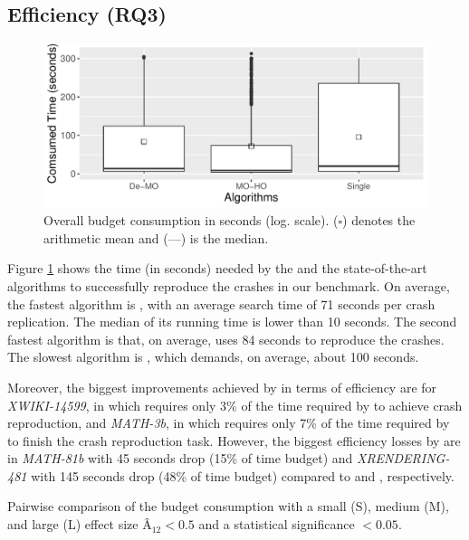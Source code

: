 \subsection{Efficiency (RQ3)}
\label{sec:results:rq3}

\begin{figure}[t]
    \centering
    \includegraphics[width=\linewidth]{papers/moho/figures/time-overall.pdf}
    \caption{Overall budget consumption in seconds (log. scale). ($\square$) denotes the arithmetic mean and (---) is the median.}
    \label{fig:eval:results-rq2-overall}
\end{figure}


Figure \ref{fig:eval:results-rq2-overall} shows the time (in seconds) needed by the \moho and the state-of-the-art algorithms to successfully reproduce the crashes in our benchmark.
On average, the fastest algorithm is \moho, with an average search time of 71 seconds per crash replication. The median of its running time is lower than 10 seconds. The second fastest algorithm is \decomposition that, on average, uses 84 seconds to reproduce the crashes. The slowest algorithm is \SGGA, which demands, on average, about 100 seconds. 

Moreover, the biggest improvements achieved by \moho in terms of efficiency are for \textit{XWIKI-14599}, in which \moho requires only 3\% of the time required by \SGGA to achieve crash reproduction, and \textit{MATH-3b}, in which \moho requires only 7\% of the time required by \decomposition to finish the crash reproduction task.
However, the biggest efficiency losses by \moho are in \textit{MATH-81b} with 45 seconds drop (15\% of time budget) and \textit{  XRENDERING-481} with 145 seconds drop (48\% of time budget) compared to \SGGA and \decomposition, respectively.

\begin{table}[t]
    \centering
    \caption{Pairwise comparison of the budget consumption with a small (S), medium (M), and large (L) effect size $\textit{\^{A}}_{12} < 0.5$ and a statistical significance $<0.05$.}
    \label{tab:efficiency}
    
\end{table}

